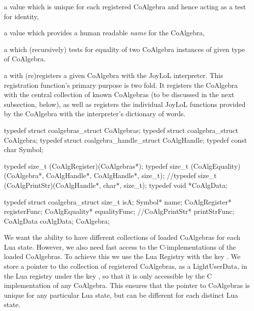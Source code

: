 \startitemize

\item a  value which is unique for each registered CoAlgebra 
and hence acting as a test for identity, 

\item a  value which provides a human readable \emph{name} 
for the CoAlgebra, 

\item a  which (recursively) tests for equality of two 
CoAlgebra instances of given type of CoAlgebra.

\item a  with (re)registers a given CoAlgebra with the 
JoyLoL interpreter. This registration function's primary purpose is two 
fold. It registers the CoAlgebra with the central collection of known 
CoAlgebras (to be discussed in the next subsection, below), as well as 
registers the individual JoyLoL functions provided by the CoAlgebra with 
the interpreter's dictionary of words. 

\stopitemize

\startCHeader
typedef struct coalgebras_struct        CoAlgebras;
typedef struct coalgebra_struct         CoAlgebra;
typedef struct coalgebra_handle_struct  CoAlgHandle;
typedef const char Symbol;

typedef size_t (CoAlgRegister)(CoAlgebras*);
typedef size_t (CoAlgEquality)(CoAlgebra*,
                               CoAlgHandle*,
                               CoAlgHandle*,
                               size_t);
//typedef size_t (CoAlgPrintStr)(CoAlgHandle*, char*, size_t);
typedef void *CoAlgData;

typedef struct coalgebra_struct {
  size_t          isA;
  Symbol*         name;
  CoAlgRegister*  registerFunc;
  CoAlgEquality*  equalityFunc;
  //CoAlgPrintStr*  printStrFunc;
  CoAlgData       coAlgData;
} CoAlgebra;
\stopCHeader


We want the ability to have different collections of loaded CoAlgebras for 
each Lua state. However, we also need fast access to the C-implementations 
of the loaded CoAlgebras. To achieve this we use the Lua Registry with the 
 key . We store a pointer to the 
collection of registered CoAlgebras, as a LightUserData, in the Lua 
registry under the key , so that it is only accessible 
by the C implementation of any CoAlgebra. This ensures that the pointer to 
CoAlgebras is unique for any particular Lua state, but can be different 
for each distinct Lua state. 

